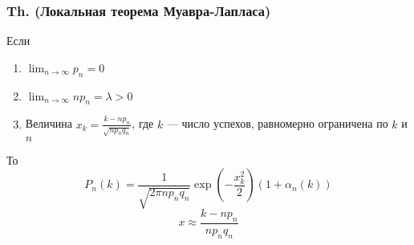 \subsubsection{Th. (Локальная теорема
Муавра-Лапласа)}\label{th.-ux43bux43eux43aux430ux43bux44cux43dux430ux44f-ux442ux435ux43eux440ux435ux43cux430-ux43cux443ux430ux432ux440ux430-ux43bux430ux43fux43bux430ux441ux430}

Если

\begin{enumerate}
\def\labelenumi{\arabic{enumi}.}

\item
  \(\lim_{n\to\infty} p_n = 0\)
\item
  \(\lim_{n\to\infty} np_n = \lambda > 0\)
\item
  Величина \(x_k = \frac{k-np_n}{\sqrt {np_n q_n}}\), где \(k\) ---
  число успехов, равномерно ограничена по \(k\) и \(n\)
\end{enumerate}

То
\[P_n(k) = \frac{1}{\sqrt{2\pi np_n q_n}}\exp(-\frac{x_k^2}{2})(1+\alpha_n(k))\]
\[x \approx \frac{k-np_n}{np_n q_n}\]
